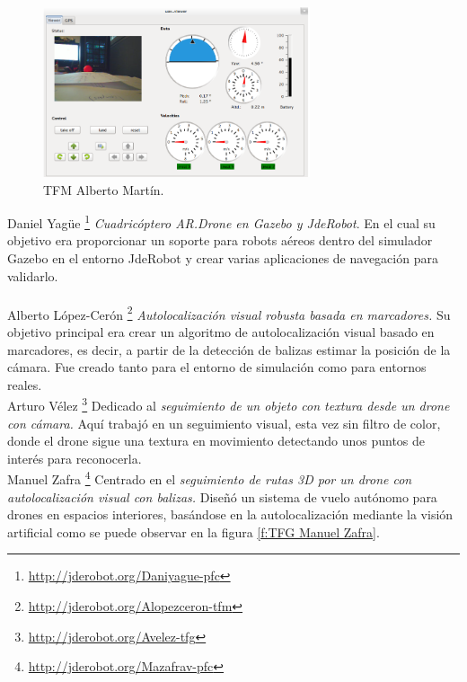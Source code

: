 \begin{figure}[H]
	\begin{center}
		\includegraphics[width=0.7\textwidth]{imag/IMG8.png}
				\caption{TFM Alberto Martín.} 
	\label{fig:TFM Alberto M.}	
	\end{center}
\end{figure}

\hspace{1cm} Daniel Yagüe  \footnote{\url{http://jderobot.org/Daniyague-pfc}} \cite{DanielYague} \textit{Cuadricóptero AR.Drone en Gazebo y JdeRobot}. En el cual su objetivo era proporcionar un soporte para robots aéreos dentro del simulador Gazebo en el entorno JdeRobot y crear varias aplicaciones de navegación para validarlo.
\\
\\

\hspace{1cm} Alberto López-Cerón \footnote{\url{http://jderobot.org/Alopezceron-tfm}} \cite{AlbertoLopez} \textit{Autolocalización visual robusta basada en marcadores.} Su objetivo principal era crear un algoritmo de autolocalización visual basado en marcadores, es decir, a partir de la detección de balizas estimar la posición de la cámara. Fue creado tanto para el entorno de simulación como para entornos reales.
\\

\hspace{1cm} Arturo Vélez \footnote{\url{http://jderobot.org/Avelez-tfg}} \cite{ArturoVelez} Dedicado al \textit{seguimiento de un objeto con textura desde un drone con cámara.} Aquí trabajó en un seguimiento visual, esta vez sin filtro de color, donde el drone sigue una textura en movimiento detectando unos puntos de interés para reconocerla.
\\

\hspace{1cm} Manuel Zafra \footnote{\url{http://jderobot.org/Mazafrav-pfc}} \cite{ManuelZafra} Centrado en el \textit{seguimiento de rutas 3D por un drone con autolocalización visual con balizas.} Diseñó un sistema de vuelo autónomo para drones en espacios interiores, basándose en la autolocalización mediante la visión artificial como se puede observar en la figura \ref{f:TFG Manuel Zafra}.
\\


